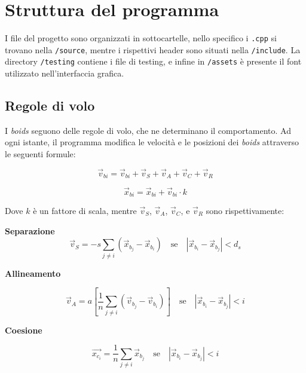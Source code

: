 \documentclass[10pt,a4paper]{article}
\begin{document}
\newpage

\section{Struttura del programma}

I file del progetto sono organizzati in sottocartelle, nello specifico i \texttt{.cpp} si trovano nella \texttt{/source}, mentre i rispettivi header sono situati nella \texttt{/include}. La directory \texttt{/testing} contiene i file di testing, e infine in \texttt{/assets} è presente il font utilizzato nell'interfaccia grafica. 

\subsection{Regole di volo}

I \textit{boids} seguono delle regole di volo, che ne determinano il comportamento. Ad ogni istante, il programma modifica le velocità e le posizioni dei \textit{boids} attraverso le seguenti formule:

\begin{equation*}
    \vec{v}_{bi} = \vec{v}_{bi} + \vec{v}_S + \vec{v}_A + \vec{v}_C + \vec{v}_R
\end{equation*}

\begin{equation*}
    \vec{x}_{bi} = \vec{x}_{bi} + \vec{v}_{bi} \cdot k
\end{equation*}

Dove $k$ è un fattore di scala, mentre $\vec{v}_S$, $\vec{v}_A$, $\vec{v}_C$, e $\vec{v}_R$ sono rispettivamente:

\textbf{Separazione}
\begin{equation*}
    \vec{v}_S = -s \sum_{j \neq i} (\vec{x}_{b_j} - \vec{x}_{b_i}) \quad \text{se} \quad \left| \vec{x}_{b_i} - \vec{x}_{b_j} \right| < d_s
\end{equation*}

\textbf{Allineamento}

\begin{equation*}
    \vec{v}_A = a \left[ \frac{1}{n} \sum_{j \neq i} (\vec{v}_{b_j} - \vec{v}_{b_i}) \right] \quad \text{se} \quad \left| \vec{x}_{b_i} - \vec{x}_{b_j} \right| < i
\end{equation*} 

\textbf{Coesione} 

\begin{equation*}
    \vec{x_{c_i}} = \frac{1}{n} \sum_{j \neq i} \vec{x}_{b_j} \quad \text{se} \quad \left| \vec{x}_{b_i} - \vec{x}_{b_j} \right| < i
\end{equation*}
\end{document}
